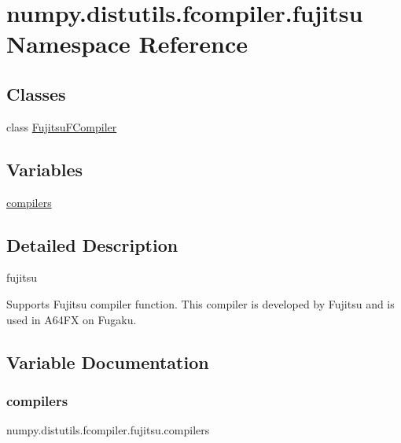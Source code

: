\hypertarget{namespacenumpy_1_1distutils_1_1fcompiler_1_1fujitsu}{}\section{numpy.\+distutils.\+fcompiler.\+fujitsu Namespace Reference}
\label{namespacenumpy_1_1distutils_1_1fcompiler_1_1fujitsu}
\subsection*{Classes}
\begin{DoxyCompactItemize}
\item 
class \hyperlink{classnumpy_1_1distutils_1_1fcompiler_1_1fujitsu_1_1FujitsuFCompiler}{Fujitsu\+F\+Compiler}
\end{DoxyCompactItemize}
\subsection*{Variables}
\begin{DoxyCompactItemize}
\item 
\hyperlink{namespacenumpy_1_1distutils_1_1fcompiler_1_1fujitsu_adba823aa6a0a13ea5a06682e337b28b5}{compilers}
\end{DoxyCompactItemize}


\subsection{Detailed Description}
\begin{DoxyVerb}fujitsu

Supports Fujitsu compiler function.
This compiler is developed by Fujitsu and is used in A64FX on Fugaku.
\end{DoxyVerb}
 

\subsection{Variable Documentation}
\mbox{\label{namespacenumpy_1_1distutils_1_1fcompiler_1_1fujitsu_adba823aa6a0a13ea5a06682e337b28b5}} 
\subsubsection{\texorpdfstring{compilers}{compilers}}
{\footnotesize\ttfamily numpy.\+distutils.\+fcompiler.\+fujitsu.\+compilers}

